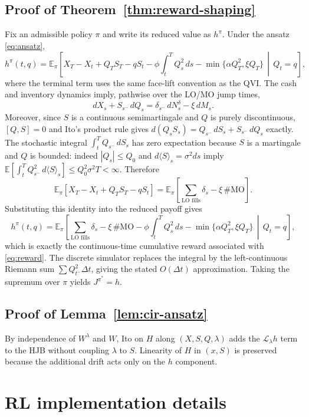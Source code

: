 \documentclass[]{interact}
\theoremstyle{plain}
\theoremstyle{definition}
\theoremstyle{remark}
\newcommand{\E}{\mathbb{E}}
\newcommand{\1}[1]{\mathbf{1}_{\{#1\}}}
\begin{document}
\subsection{Proof of Theorem~\ref{thm:reward-shaping}}
Fix an admissible policy $\pi$ and write its reduced value as $h^\pi$. Under the ansatz \eqref{eq:ansatz},
\[
h^\pi(t,q)
= \E_\pi\!\left[
X_T-X_t + Q_T S_T - qS_t
-\phi\int_t^T Q_s^2\,ds
-\min\{\alpha Q_T^2,\xi Q_T\}
\,\middle|\, Q_t=q\right],
\]
where the terminal term uses the same face-lift convention as the QVI. The cash and inventory dynamics imply, pathwise over the LO/MO jump times,
\[
dX_s + S_{s^-}\,dQ_s = \delta_{s^-}\,dN_s^\delta - \xi\,dM_s.
\]
Moreover, since $S$ is a continuous semimartingale and $Q$ is purely discontinuous, $[Q,S]=0$ and Ito's product rule gives
$d(Q_sS_s)=Q_{s^-}\,dS_s+S_{s^-}\,dQ_s$ exactly. The stochastic integral $\int_t^T Q_{s^-}\,dS_s$ has zero expectation because $S$ is a martingale and $Q$ is bounded: indeed $|Q_s|\le Q_0$ and $d\langle S\rangle_s=\sigma^2ds$ imply $\E[\int_t^T Q_{s^-}^2\,d\langle S\rangle_s]\le Q_0^2\sigma^2T<\infty$. Therefore
\[
\E_\pi[X_T-X_t+Q_T S_T-qS_t]
=\E_\pi\!\left[\sum_{\text{LO fills}}\delta_s-\xi\,\#\text{MO}\right].
\]
Substituting this identity into the reduced payoff gives
\[
h^\pi(t,q)
=\E_\pi\!\left[
\sum_{\text{LO fills}}\delta_s
-\xi\,\#\text{MO}
-\phi\int_t^T Q_s^2\,ds
-\min\{\alpha Q_T^2,\xi Q_T\}
\,\middle|\, Q_t=q\right],
\]
which is exactly the continuous-time cumulative reward associated with \eqref{eq:reward}. The discrete simulator replaces the integral by the left-continuous Riemann sum $\sum Q_{t^-}^2\Delta t$, giving the stated $O(\Delta t)$ approximation. Taking the supremum over $\pi$ yields $J^{\pi^*}=h$.

\subsection{Proof of Lemma~\ref{lem:cir-ansatz}}
By independence of $W^\lambda$ and $W$, Ito on $H$ along $(X, S, Q, \lambda)$ adds the $\mathcal{L}_\lambda h$ term to the HJB without coupling $\lambda$ to $S$. Linearity of $H$ in $(x, S)$ is preserved because the additional drift acts only on the $h$ component.

\section{RL implementation details}\label{app:rl-details}
\end{document}
